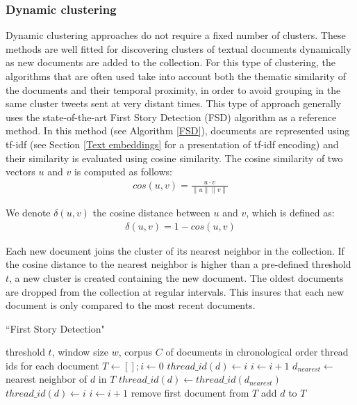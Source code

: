 	\subsubsection{Dynamic clustering \label{Subsubsec: incremental clustering}} Dynamic clustering approaches do not require a fixed number of clusters. These methods are well fitted for discovering clusters of textual documents dynamically as new documents are added to the collection. For this type of clustering, the algorithms that are often used take into account both the thematic similarity of the documents and their temporal proximity, in order to avoid grouping in the same cluster tweets sent at very distant times. This type of approach generally uses the state-of-the-art First Story Detection (FSD) \citep{allan_introduction_2002} algorithm as a reference method. In this method (see Algorithm \ref{FSD}), documents are represented using tf-idf (see Section \ref{Text embeddings} for a presentation of tf-idf encoding) and their similarity is evaluated using cosine similarity. The cosine similarity of two vectors $u$ and $v$  is computed as follows:
	\begin{align}
    cos(u, v) = \frac{u \cdot v}{\| u\|\| v\|}
	\end{align}
	
	We denote $\delta(u,v)$ the cosine distance between $u$ and $v$, which is defined as:
	\begin{align}
	    \delta(u,v) = 1 - cos(u, v)
	\end{align}
	
	Each new document joins the cluster of its nearest neighbor in the collection. If the cosine distance to the nearest neighbor is higher than a pre-defined threshold $t$, a new cluster is created containing the new document. The oldest documents are dropped from the collection at regular intervals. This insures that each new document is only compared to the most recent documents. 

\begin{algorithm}
\caption{``First Story Detection"}
\label{FSD}
\begin{algorithmic}[1]
\REQUIRE threshold $t$, window size $w$, corpus $C$ of documents in chronological order
\ENSURE thread ids for each document
\STATE $T \leftarrow \left[ \right] ; i \leftarrow 0 $
\STATE $thread\_id(d) \leftarrow i$
\STATE $i \leftarrow i+1$
\ELSE
\STATE $d_{nearest} \leftarrow $ nearest neighbor of $d$ in $T$
\STATE $thread\_id(d) \leftarrow thread\_id(d_{nearest})$
\ELSE
\STATE $thread\_id(d) \leftarrow i$
\STATE $i \leftarrow i+1$
\ENDIF
\ENDIF
{}
\STATE remove first document from $T$
\ENDIF
\STATE add $d$ to $T$
\ENDWHILE
\end{algorithmic}
\end{algorithm}



